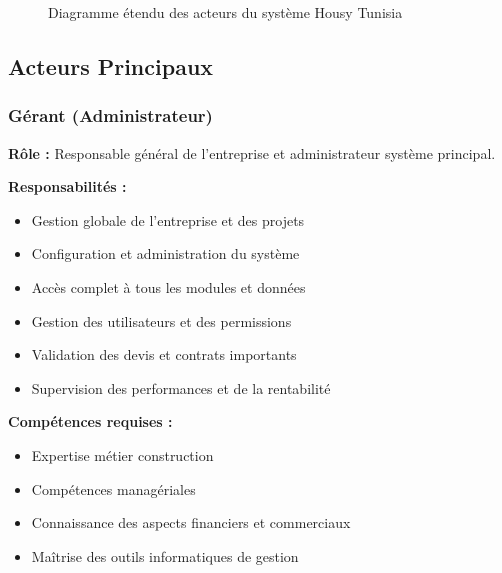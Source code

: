\begin{figure}[H]
\caption{Diagramme étendu des acteurs du système Housy Tunisia}
\label{fig:acteurs_systeme_etendu}
\end{figure}

\subsection{Acteurs Principaux}

\subsubsection{Gérant (Administrateur)}

\textbf{Rôle :} Responsable général de l'entreprise et administrateur système principal.

\textbf{Responsabilités :}
\begin{itemize}
    \item Gestion globale de l'entreprise et des projets
    \item Configuration et administration du système
    \item Accès complet à tous les modules et données
    \item Gestion des utilisateurs et des permissions
    \item Validation des devis et contrats importants
    \item Supervision des performances et de la rentabilité
\end{itemize}

\textbf{Compétences requises :}
\begin{itemize}
    \item Expertise métier construction
    \item Compétences managériales
    \item Connaissance des aspects financiers et commerciaux
    \item Maîtrise des outils informatiques de gestion
\end{itemize}


